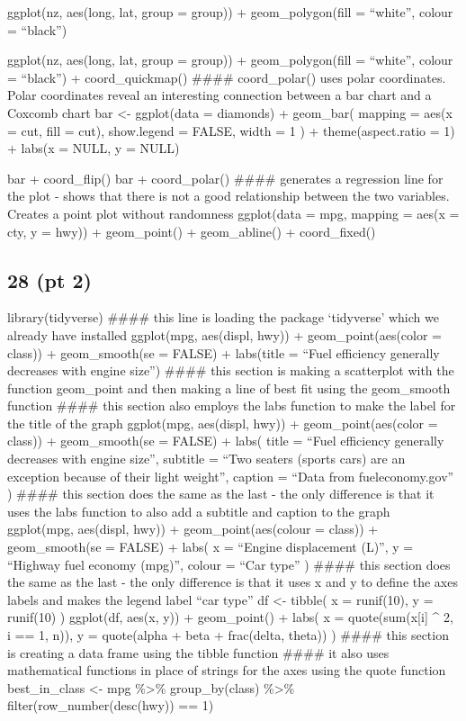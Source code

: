 \documentclass[
]{article}
\begin{document}
ggplot(nz, aes(long, lat, group = group)) + geom\_polygon(fill =
``white'', colour = ``black'')

ggplot(nz, aes(long, lat, group = group)) + geom\_polygon(fill =
``white'', colour = ``black'') + coord\_quickmap() \#\#\#\#
coord\_polar() uses polar coordinates. Polar coordinates reveal an
interesting connection between a bar chart and a Coxcomb chart bar
\textless- ggplot(data = diamonds) + geom\_bar( mapping = aes(x = cut,
fill = cut), show.legend = FALSE, width = 1 ) + theme(aspect.ratio = 1)
+ labs(x = NULL, y = NULL)

bar + coord\_flip() bar + coord\_polar() \#\#\#\# generates a regression
line for the plot - shows that there is not a good relationship between
the two variables. Creates a point plot without randomness ggplot(data =
mpg, mapping = aes(x = cty, y = hwy)) + geom\_point() + geom\_abline() +
coord\_fixed()

\hypertarget{pt-2}{%
\subsection{28 (pt 2)}\label{pt-2}}

library(tidyverse) \#\#\#\# this line is loading the package `tidyverse'
which we already have installed ggplot(mpg, aes(displ, hwy)) +
geom\_point(aes(color = class)) + geom\_smooth(se = FALSE) + labs(title
= ``Fuel efficiency generally decreases with engine size'') \#\#\#\#
this section is making a scatterplot with the function geom\_point and
then making a line of best fit using the geom\_smooth function \#\#\#\#
this section also employs the labs function to make the label for the
title of the graph ggplot(mpg, aes(displ, hwy)) + geom\_point(aes(color
= class)) + geom\_smooth(se = FALSE) + labs( title = ``Fuel efficiency
generally decreases with engine size'', subtitle = ``Two seaters (sports
cars) are an exception because of their light weight'', caption = ``Data
from fueleconomy.gov'' ) \#\#\#\# this section does the same as the last
- the only difference is that it uses the labs function to also add a
subtitle and caption to the graph ggplot(mpg, aes(displ, hwy)) +
geom\_point(aes(colour = class)) + geom\_smooth(se = FALSE) + labs( x =
``Engine displacement (L)'', y = ``Highway fuel economy (mpg)'', colour
= ``Car type'' ) \#\#\#\# this section does the same as the last - the
only difference is that it uses x and y to define the axes labels and
makes the legend label ``car type'' df \textless- tibble( x = runif(10),
y = runif(10) ) ggplot(df, aes(x, y)) + geom\_point() + labs( x =
quote(sum(x{[}i{]} \^{} 2, i == 1, n)), y = quote(alpha + beta +
frac(delta, theta)) ) \#\#\#\# this section is creating a data frame
using the tibble function \#\#\#\# it also uses mathematical functions
in place of strings for the axes using the quote function
best\_in\_class \textless- mpg \%\textgreater\% group\_by(class)
\%\textgreater\% filter(row\_number(desc(hwy)) == 1)
\end{document}
